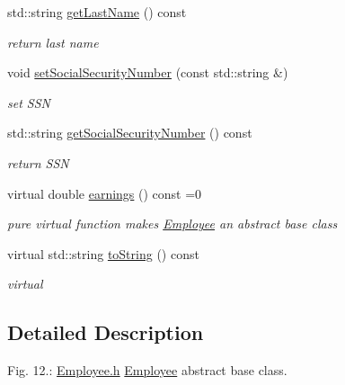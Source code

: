 \begin{DoxyCompactItemize}
std\+::string \mbox{\hyperlink{class_employee_a9a9e3d0c77c609e5016589926844b003}{get\+Last\+Name}} () const
\begin{DoxyCompactList}\small\item\em return last name \end{DoxyCompactList}\item 
\mbox{\label{class_employee_a981082b8cf7727af8fbff6291dd03bee}} 
void \mbox{\hyperlink{class_employee_a981082b8cf7727af8fbff6291dd03bee}{set\+Social\+Security\+Number}} (const std\+::string \&)
\begin{DoxyCompactList}\small\item\em set S\+SN \end{DoxyCompactList}\item 
\mbox{\label{class_employee_afe97463fcee4f5cbc6eb55914887789f}} 
std\+::string \mbox{\hyperlink{class_employee_afe97463fcee4f5cbc6eb55914887789f}{get\+Social\+Security\+Number}} () const
\begin{DoxyCompactList}\small\item\em return S\+SN \end{DoxyCompactList}\item 
virtual double \mbox{\hyperlink{class_employee_a821a8bea1db657efc004670c8481cbae}{earnings}} () const =0
\begin{DoxyCompactList}\small\item\em pure virtual function makes \mbox{\hyperlink{class_employee}{Employee}} an abstract base class \end{DoxyCompactList}\item 
\mbox{\label{class_employee_aff7d34f5d6587ba947313b3bbce3e52d}} 
virtual std\+::string \mbox{\hyperlink{class_employee_aff7d34f5d6587ba947313b3bbce3e52d}{to\+String}} () const
\begin{DoxyCompactList}\small\item\em virtual \end{DoxyCompactList}\end{DoxyCompactItemize}


\subsection{Detailed Description}
Fig. 12.\+: \mbox{\hyperlink{_employee_8h_source}{Employee.\+h}} \mbox{\hyperlink{class_employee}{Employee}} abstract base class. 

